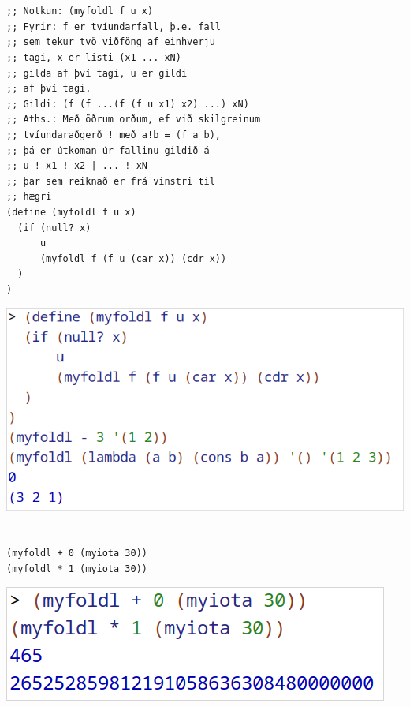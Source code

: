 \documentclass{article}
\begin{document}
	\section{}
	\begin{verbatim}
;; Notkun: (myfoldl f u x)
;; Fyrir: f er tvíundarfall, þ.e. fall
;; sem tekur tvö viðföng af einhverju
;; tagi, x er listi (x1 ... xN)
;; gilda af því tagi, u er gildi
;; af því tagi.
;; Gildi: (f (f ...(f (f u x1) x2) ...) xN)
;; Aths.: Með öðrum orðum, ef við skilgreinum
;; tvíundaraðgerð ! með a!b = (f a b),
;; þá er útkoman úr fallinu gildið á
;; u ! x1 ! x2 | ... ! xN
;; þar sem reiknað er frá vinstri til
;; hægri
(define (myfoldl f u x)
  (if (null? x)
      u
      (myfoldl f (f u (car x)) (cdr x))
  )
)
	\end{verbatim}
	\begin{center}
		\includegraphics[scale=0.35]{myfoldl.png}
	\end{center}

	\section{}
	\begin{verbatim}
(myfoldl + 0 (myiota 30))
(myfoldl * 1 (myiota 30))
	\end{verbatim}
	\begin{center}
		\includegraphics[scale=0.35]{30.png}
	\end{center}
\end{document}
